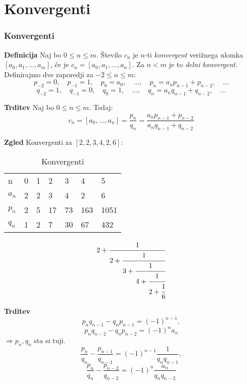 \documentclass{beamer}
\newenvironment{df}{\begin{block}{\textbf{Definicija}}}{\end{block}}
\newenvironment{zg}{\begin{block}{\textbf{Zgled}}}{\end{block}}
\newenvironment{trd}{\begin{block}{\textbf{Trditev}}}{\end{block}}
\begin{document}
\section{Konvergenti}

\begin{frame}
	\frametitle{Konvergenti}
	\begin{df}
		Naj bo $0 \leq n \leq m$. Število $c_n$ je $n$-ti \textit{konvergent} verižnega ulomka $[a_0, a_1, ..., a_m]$, če je $c_n = [a_0, a_1, ..., a_n]$. Za $n < m$ je to \textit{delni konvergent}.\\
		\vspace{3mm}
		Definirajmo dve zaporedji za $-2\leq n \leq m$:
		\[ p_{-2} = 0, \quad p_{-1} = 1, \quad p_0 = a_0, \quad \dots, \quad p_n = a_{n}p_{n-1} + p_{n-2}, \quad \dots \]
		\[ q_{-2} = 1,\quad q_{-1} = 0,\quad q_0 = 1,\quad \dots,\quad q_n = a_{n}q_{n-1} + q_{n-2},\quad \dots \]
	\end{df}
\pause
	\begin{trd}
	Naj bo $0\leq n \leq m$. Tedaj: \[c_n = [a_0, ..., a_n] = \frac{p_n}{q_n} = \frac{a_{n}p_{n-1} + p_{n-2}}{a_{n}q_{n-1} + q_{n-2}}\]
	\end{trd}
\end{frame}

\begin{frame}
	\begin{zg}
	Konvergenti za $[2, 2, 3, 4, 2, 6]$:
	\begin{table}[]
	\centering
	\caption{Konvergenti}
	\label{Tabela 1}
	\begin{tabular}{l|llllll}
	n    & 0   & 1   & 2    & 3     & 4      & 5        \\
	$a_n$ & 2   & 2   & 3    & 4     & 2      & 6        \\
	$p_n$ & 2   & 5   & 17   & 73    & 163    & 1051     \\
	$q_n$ & 1   & 2   & 7    & 30    & 67     & 432
		\end{tabular}
		\end{table}
		\[ 2 + \cfrac{1}{2 + \cfrac{1}{3+\cfrac{1}{4+\cfrac{1}{2+\cfrac{1}{6}}}}} \]
	\end{zg}
\end{frame}

\begin{frame}
	\begin{trd}
	\[ p_n q_{n-1} - q_n p_{n-1} = (-1)^{n-1}, \] 
	\[ p_n q_{n-2} - q_n p_{n-2} = (-1)^n a_n \] \pause \hspace{4cm}$\Rightarrow p_n, q_n$ sta si tuji. \vspace{5mm} \pause
	\[ \frac{p_n}{q_n} - \frac{p_{n-1}}{q_{n-1}} = (-1)^{n-1}\frac{1}{q_n q_{n-1}}, \]
	\[ \frac{p_n}{q_n} - \frac{p_{n-2}}{q_{n-2}} = (-1)^{n}\frac{a_n}{q_n q_{n-2}} \]
	\end{trd}
\end{frame}
\end{document}
